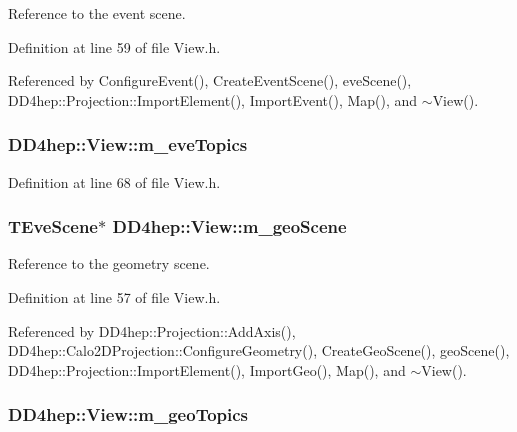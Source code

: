 Reference to the event scene. 

Definition at line 59 of file View.h.

Referenced by ConfigureEvent(), CreateEventScene(), eveScene(), DD4hep::Projection::ImportElement(), ImportEvent(), Map(), and $\sim$View().\hypertarget{class_d_d4hep_1_1_view_a6d3c5e7719c79fc50b50f575924b5bf5}{
\subsubsection[{m\_\-eveTopics}]{ {\bf DD4hep::View::m\_\-eveTopics}}}
\label{class_d_d4hep_1_1_view_a6d3c5e7719c79fc50b50f575924b5bf5}


Definition at line 68 of file View.h.\hypertarget{class_d_d4hep_1_1_view_a26d377786acafb43d0fccf8752d2bd79}{
\subsubsection[{m\_\-geoScene}]{\setlength{\rightskip}{0pt plus 5cm}TEveScene$\ast$ {\bf DD4hep::View::m\_\-geoScene}}}
\label{class_d_d4hep_1_1_view_a26d377786acafb43d0fccf8752d2bd79}


Reference to the geometry scene. 

Definition at line 57 of file View.h.

Referenced by DD4hep::Projection::AddAxis(), DD4hep::Calo2DProjection::ConfigureGeometry(), CreateGeoScene(), geoScene(), DD4hep::Projection::ImportElement(), ImportGeo(), Map(), and $\sim$View().\hypertarget{class_d_d4hep_1_1_view_a43c344306103039f764355833cee51c7}{
\subsubsection[{m\_\-geoTopics}]{ {\bf DD4hep::View::m\_\-geoTopics}}}
\label{class_d_d4hep_1_1_view_a43c344306103039f764355833cee51c7}


